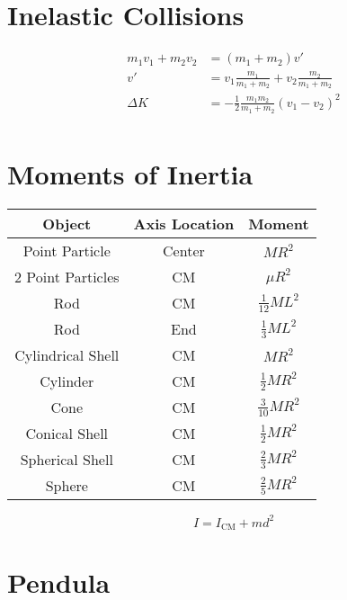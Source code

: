\documentclass[12pt]{article}
\begin{document}
\section{Inelastic Collisions}

\begin{align*}
    m_1 v_1 + m_2 v_2 &= \left (m_1 + m_2 \right) v' \\
    v' &= v_1 \frac{m_1}{m_1 + m_2} + v_2 \frac{m_2}{m_1 + m_2} \\
    \Delta K &= - \frac{1}{2} \frac{m_1 m_2}{m_1 + m_2} \left (v_1 - v_2 \right )^2 \\
\end{align*}

\section{Moments of Inertia}

\begin{center}
    \begin{tabular}{ ||c|c|c|| } 
        \hline
        \hline
        \textbf{ Object } & \textbf{Axis Location} & \textbf{Moment} \\ 
        \hline
        \hline
        Point Particle & Center & $MR^2$ \\
        \hline
        2 Point Particles & CM & $\mu R^2$ \\
        \hline
        Rod & CM & $\frac{1}{12} ML^2$ \\
        \hline
        Rod & End & $\frac{1}{3} ML^2$ \\
        \hline
        Cylindrical Shell & CM & $MR^2$ \\
        \hline
        Cylinder & CM & $\frac{1}{2} MR^2$ \\
        \hline
        Cone & CM & $\frac{3}{10} MR^2$ \\
        \hline
        Conical Shell & CM & $\frac{1}{2} MR^2$ \\
        \hline
        Spherical Shell & CM & $\frac{2}{3} MR^2$ \\
        \hline
        Sphere & CM & $\frac{2}{5} MR^2$ \\
        \hline
        \hline
    \end{tabular}
\end{center}

\[
    I = I_{\text{CM}} + md^2
\]

\section{Pendula}
\end{document}
